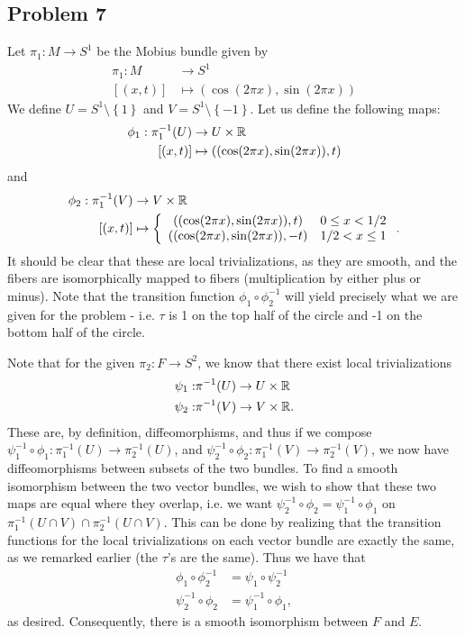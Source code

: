 \documentclass{../../mathnotes}
\begin{document}
\subsection*{Problem 7}

Let $\pi_1:M\to S^1$ be the Mobius bundle given by
\begin{align*}
    \pi_1: M &\to S^1\\
    [(x,t)]&\mapsto \left( \cos(2\pi x),\sin(2\pi x) \right)
\end{align*}
We define $U=S^1\setminus\left\{ 1 \right\}$ and $V=S^1\setminus\left\{ -1 \right\}$.
Let us define the following maps:
\begin{align*}
    \phi_1: \pi_1^{-1}(U)&\to U\times \mathbb{R}\\
    [(x,t)]&\mapsto \left( (\cos(2\pi x), \sin(2\pi x)), t \right)
\end{align*}
and
\begin{align*}
    \phi_2: \pi_1^{-1}(V)&\to V\times \R\\
    [(x,t)]&\mapsto
    \left\{ 
        \begin{array}[]{cc}
            ( (\cos(2\pi x),\sin(2\pi x)), t) & 0\leq x < 1/2\\
            ( (\cos(2\pi x),\sin(2\pi x)), -t) & 1/2< x \leq 1\\
        \end{array}
        \right..
\end{align*}
It should be clear that these are local trivializations, as they are smooth, and the fibers are
isomorphically mapped to fibers (multiplication by either plus or minus).
Note that the transition function $\phi_1\circ \phi_2^{-1}$ will yield precisely what we are given
for the problem - i.e. $\tau$ is 1 on the top half of the circle and -1 on the bottom half of the
circle.

Note that for the given $\pi_2:F\to S^2$, we know that there exist local trivializations 
\begin{align*}
    \psi_1: & \pi^{-1}(U)\to U\times \mathbb{R}\\
    \psi_2: & \pi^{-1}(V)\to V\times \mathbb{R}.
\end{align*}
These are, by definition, diffeomorphisms, and thus if we compose $\psi_1^{-1}\circ\phi_1:\pi_1^{-1}(U)\to\pi_2^{-1}(U)$,
and $\psi_2^{-1}\circ\phi_2:\pi_1^{-1}(V)\to\pi_2^{-1}(V)$, we now have diffeomorphisms between subsets of the two bundles.
To find a smooth isomorphism between the two vector bundles, we wish to show that these two maps are equal where they overlap,
i.e. we want $\psi_2^{-1}\circ\phi_2=\psi_1^{-1}\circ\phi_1$ on $\pi_1^{-1}(U\cap V)\cap\pi_2^{-1}(U\cap V)$.
This can be done by realizing that the transition functions for the local trivializations on each vector bundle
are exactly the same, as we remarked earlier (the $\tau$'s are the same). Thus we have that
\begin{align*}
    \phi_1\circ\phi_2^{-1}&=\psi_1\circ\psi_2^{-1}\\
    \psi_2^{-1}\circ\phi_2&=\psi_1^{-1}\circ\phi_1,
\end{align*}
as desired. Consequently, there is a smooth isomorphism between $F$ and $E$.
\end{document}
